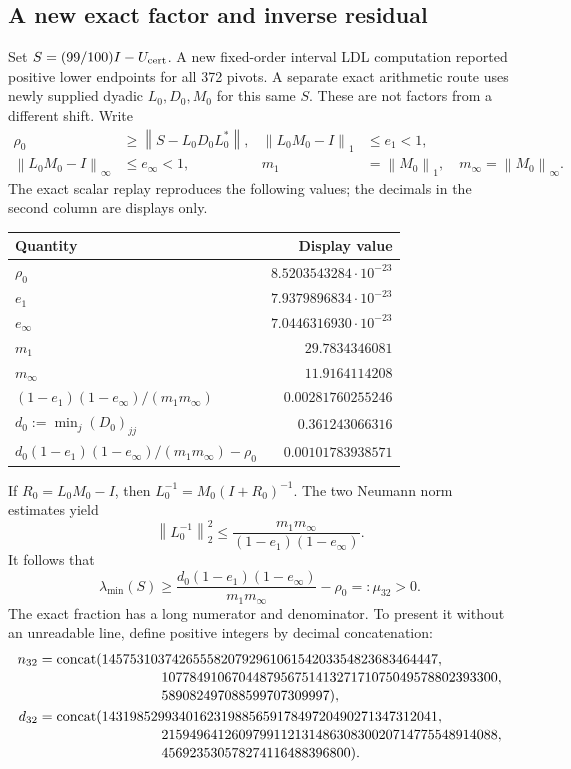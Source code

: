 \documentclass[11pt,a4paper]{article}
\numberwithin{equation}{section}
\theoremstyle{definition}\newtheorem{definition}[theorem]{Definition}
\theoremstyle{remark}\newtheorem{remark}[theorem]{Remark}
\newcommand{\norm}[1]{\left\|#1\right\|}
\begin{document}
\subsection{A new exact factor and inverse residual}
Set $S=(99/100)I-U_{\rm cert}$. A new fixed-order interval LDL computation reported positive lower endpoints for all 372 pivots. A separate exact arithmetic route uses newly supplied dyadic $L_0,D_0,M_0$ for this same $S$. These are not factors from a different shift. Write
\begin{align}\label{eq:factor32}
 \rho_0&\ge\norm{S-L_0D_0L_0^*},&
 \norm{L_0M_0-I}_1&\le e_1<1,\nonumber\\
 \norm{L_0M_0-I}_\infty&\le e_\infty<1,&
 m_1&=\norm{M_0}_1,\quad m_\infty=\norm{M_0}_\infty.
\end{align}
The exact scalar replay reproduces the following values; the decimals in the second column are displays only.
\begingroup\small
\begin{longtable}{>{\raggedright\arraybackslash}p{.59\linewidth}r}
\toprule
Quantity & Display value\\\midrule\endhead
$\rho_0$ & $8.5203543284\cdot10^{-23}$\\
$e_1$ & $7.9379896834\cdot10^{-23}$\\
$e_\infty$ & $7.0446316930\cdot10^{-23}$\\
$m_1$ & $29.7834346081$\\
$m_\infty$ & $11.9164114208$\\
$(1-e_1)(1-e_\infty)/(m_1m_\infty)$ & $0.00281760255246$\\
$d_0:=\min_j(D_0)_{jj}$ & $0.361243066316$\\
$d_0(1-e_1)(1-e_\infty)/(m_1m_\infty)-\rho_0$ & $0.00101783938571$\\
\bottomrule
\end{longtable}
\endgroup
If $R_0=L_0M_0-I$, then $L_0^{-1}=M_0(I+R_0)^{-1}$. The two Neumann norm estimates yield
\[
 \norm{L_0^{-1}}_2^2\le
 \frac{m_1m_\infty}{(1-e_1)(1-e_\infty)}.
\]
It follows that
\begin{equation}\label{eq:margin32}
 \lambda_{\min}(S)\ge
 \frac{d_0(1-e_1)(1-e_\infty)}{m_1m_\infty}-\rho_0
 =:\mu_{32}>0.
\end{equation}
The exact fraction has a long numerator and denominator. To present it without an unreadable line, define positive integers by decimal concatenation:
\begin{align*}
 n_{32}&=\operatorname{concat}(145753103742655582079296106154203354823683464447,\\[-2pt]
 &\hspace{31mm}107784910670448795675141327171075049578802393300,\\[-2pt]
 &\hspace{31mm}589082497088599707309997),\\
 d_{32}&=\operatorname{concat}(143198529934016231988565917849720490271347312041,\\[-2pt]
 &\hspace{31mm}215949641260979911213148630830020714775548914088,\\[-2pt]
 &\hspace{31mm}456923530578274116488396800).
\end{align*}
\end{document}
